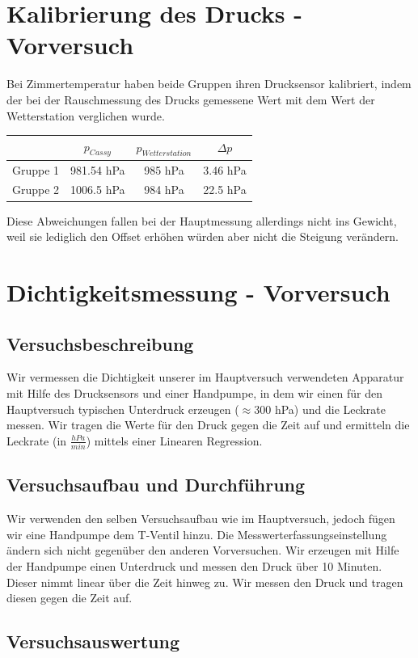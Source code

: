 \documentclass[12pt,a4paper]{article}
\begin{document}
\section{Kalibrierung des Drucks - Vorversuch}
Bei Zimmertemperatur haben beide Gruppen ihren Drucksensor kalibriert, indem der bei der Rauschmessung des Drucks gemessene Wert mit dem Wert der Wetterstation verglichen wurde.
\begin{table}[H]\centering
\begin{tabular}{|c|c|c|c|}
\hline 
 & $p_{Cassy}$ & $p_{Wetterstation}$ & $\Delta p$ \\ 
\hline 
Gruppe 1 & 981.54 hPa & 985 hPa & 3.46 hPa \\ 
\hline 
Gruppe 2 & 1006.5 hPa & 984 hPa & 22.5 hPa \\ 
\hline 
\end{tabular} 
\end{table}

Diese Abweichungen fallen bei der Hauptmessung allerdings nicht ins Gewicht, weil sie lediglich den Offset erhöhen würden aber nicht die Steigung verändern.
\newpage
\section{Dichtigkeitsmessung - Vorversuch}
\subsection{Versuchsbeschreibung}
Wir vermessen die Dichtigkeit unserer im Hauptversuch verwendeten Apparatur mit Hilfe des Drucksensors und einer Handpumpe, in dem wir einen für den Hauptversuch typischen Unterdruck erzeugen ($\approx$300 hPa) und die Leckrate messen. Wir tragen die Werte für den Druck gegen die Zeit auf und ermitteln die Leckrate (in $\frac{hPa}{min}$) mittels einer Linearen Regression.

\subsection{Versuchsaufbau und Durchführung}
Wir verwenden den selben Versuchsaufbau wie im Hauptversuch, jedoch fügen wir eine Handpumpe dem T-Ventil hinzu. Die Messwerterfassungseinstellung ändern sich nicht gegenüber den anderen Vorversuchen.
Wir erzeugen mit Hilfe der Handpumpe einen Unterdruck und messen den Druck über 10 Minuten. Dieser nimmt linear über die Zeit hinweg zu. Wir messen den Druck und tragen diesen gegen die Zeit auf.
\subsection{Versuchsauswertung}
\end{document}
